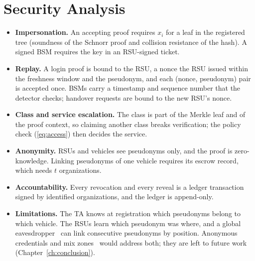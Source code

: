 \section{Security Analysis}

\begin{itemize}
  \item \textbf{Impersonation.} An accepting proof requires $x_i$ for a leaf in the registered tree
  (soundness of the Schnorr proof and collision resistance of the hash). A signed BSM requires the
  key in an RSU-signed ticket.
  \item \textbf{Replay.} A login proof is bound to the RSU, a nonce the RSU issued within the
  freshness window and the pseudonym, and each (nonce, pseudonym) pair is accepted once. BSMs carry a
  timestamp and sequence number that the detector checks; handover requests are bound to the new
  RSU's nonce.
  \item \textbf{Class and service escalation.} The class is part of the Merkle leaf and of the proof
  context, so claiming another class breaks verification; the policy check (\ref{eq:access}) then
  decides the service.
  \item \textbf{Anonymity.} RSUs and vehicles see pseudonyms only, and the proof is zero-knowledge.
  Linking pseudonyms of one vehicle requires its escrow record, which needs $t$ organizations.
  \item \textbf{Accountability.} Every revocation and every reveal is a ledger transaction signed by
  identified organizations, and the ledger is append-only.
  \item \textbf{Limitations.} The TA knows at registration which pseudonyms belong to which vehicle.
  The RSUs learn which pseudonym was where, and a global eavesdropper~\cite{gruteser2005tracking} can link consecutive pseudonyms
  by position. Anonymous credentials and mix zones~\cite{beresford2003mix,freudiger2007mix} would address both; they are left to future work
  (Chapter~\ref{ch:conclusion}).
\end{itemize}
